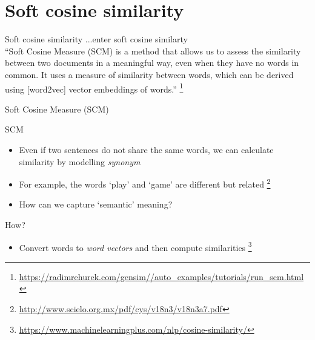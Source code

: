 \documentclass[compress]{beamer}
\begin{document}


\section{Soft cosine similarity}
\begin{frame}{Soft cosine similarity}
	\huge{...enter soft cosine similarty} \parencite{Sidorov2014}\\
	\pause
	\footnotesize{``Soft Cosine Measure (SCM) is a method that allows us to assess the similarity between two documents in a meaningful way, even when they have no words in common. It uses a measure of similarity between words, which can be derived using [word2vec] vector embeddings of words.''}
	\footnote{\url{https://radimrehurek.com/gensim//auto_examples/tutorials/run_scm.html}}
\end{frame}

\begin{frame}{Soft Cosine Measure (SCM)}
	\begin{block}{SCM}
		\begin{itemize}
			\item <1-> Even if two sentences do not share the same words, we can calculate similarity by modelling \emph{synonym}
			\item <2->For example, the words `play' and `game' are different but related \parencite{Sidorov2014} \footnote{\url{http://www.scielo.org.mx/pdf/cys/v18n3/v18n3a7.pdf}}
			\item<3->How can we capture `semantic' meaning?
		\end{itemize}
	\end{block}
	\begin{exampleblock}{How?}
		\begin{itemize}
			\item <4-> Convert words to \emph{word vectors} and then compute similarities  \footnote{\url{https://www.machinelearningplus.com/nlp/cosine-similarity/}}
		\end{itemize}
	\end{exampleblock}
\end{frame}
\end{document}
